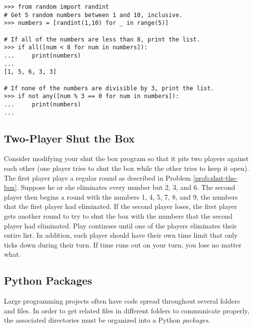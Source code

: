 \begin{lstlisting}
>>> from random import randint
# Get 5 random numbers between 1 and 10, inclusive.
>>> numbers = [randint(1,10) for _ in range(5)]

# If all of the numbers are less than 8, print the list.
>>> if all([num < 8 for num in numbers]):
...     print(numbers)
...
[1, 5, 6, 3, 3]

# If none of the numbers are divisible by 3, print the list.
>>> if not any([num % 3 == 0 for num in numbers]):
...     print(numbers)
...
\end{lstlisting}

\subsection*{Two-Player Shut the Box} %

Consider modifying your shut the box program so that it pits two players against each other (one player tries to shut the box while the other tries to keep it open).
The first player plays a regular round as described in Problem \ref{prob:shut-the-box}.
Suppose he or she eliminates every number but 2, 3, and 6.
The second player then begins a round with the numbers 1, 4, 5, 7, 8, and 9, the numbers that the first player had eliminated.
If the second player loses, the first player gets another round to try to shut the box with the numbers that the second player had eliminated.
Play continues until one of the players eliminates their entire list.
In addition, each player should have their own time limit that only ticks down during their turn.
If time runs out on your turn, you lose no matter what.

\subsection*{Python Packages} %

Large programming projects often have code spread throughout several folders and files.
In order to get related files in different folders to communicate properly, the associated directories must be organized into a Python \emph{packages}.


